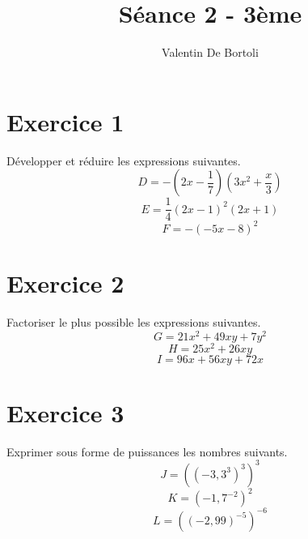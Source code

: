 \documentclass[10pt,a4paper]{article}
\title{Séance 2 - 3ème}
\author{Valentin De Bortoli}
\begin{document}
\maketitle
\section{Exercice 1}
Développer et réduire les expressions suivantes.
\begin{equation}
D=-(2x-\frac{1}{7})(3x^2+\frac{x}{3})
\end{equation}
\begin{equation}
E=\frac{1}{4}(2x-1)^2(2x+1)
\end{equation}
\begin{equation}
F=-(-5x-8)^2
\end{equation}
\section{Exercice 2}
Factoriser le plus possible les expressions suivantes.
\begin{equation}
G=21x^2+49xy+7y^2
\end{equation}
\begin{equation}
H=25x^2+26xy
\end{equation}
\begin{equation}
I=96x+56xy+72x
\end{equation}
\section{Exercice 3}
Exprimer sous forme de puissances les nombres suivants.
\begin{equation}
J=((-3,3^3)^3)^3
\end{equation}
\begin{equation}
K=(-1,7^{-2})^2
\end{equation}
\begin{equation}
L=((-2,99)^{-5})^{-6}
\end{equation}
\end{document}
